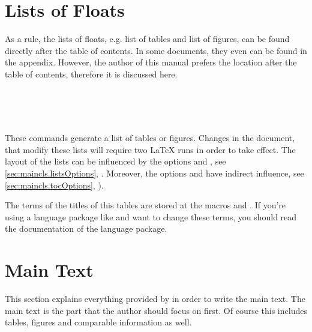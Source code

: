 \section{Lists of Floats}

As a rule, the lists of floats,
e.g. list of tables and
list of figures, can be found directly
after the table of contents.
In some documents, they even can be found in the appendix.
However, the author of this manual prefers the location
after the table of contents, therefore it is discussed here.

\begin{Declaration}
  \\
  \\
  \\
\end{Declaration}
%
%
%
%
These commands generate a list of tables or figures.  Changes in the document,
that modify these lists will require two \LaTeX{} runs in order to take
effect.  The layout of the lists can be influenced by the options
 and , see
\autoref{sec:maincls.listsOptions},
.  Moreover, the options
 and  have indirect influence,
see \autoref{sec:maincls.tocOptions},
).

\begin{Explain}
The terms of the titles of this tables are stored at the macros
 and . If you're using a language
package like  and want to change these terms, you should read
the documentation of the language package.
\end{Explain}
%
%
%
%
%


\section{Main Text}
\label{sec:maincls.mainText}

This section explains everything provided by \KOMAScript{}
in order to write the main text. The main text is the
part that the author should focus on first.
Of course this includes tables, figures and comparable
information as well.

